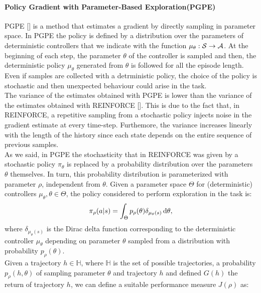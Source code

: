 \paragraph{Policy Gradient with Parameter-Based Exploration(PGPE)} \label{subsec:pgpe}
\ac{PGPE} [\cite{sehnke2008PolicyGradient}] is a method that estimates a gradient by directly sampling in parameter space. In \ac{PGPE} the policy is defined by a distribution over the parameters of deterministic controllers that we indicate with the function $\mu_{\theta}: \mathcal{S} \to \mathcal{A}$. At the beginning of each step, the parameter $\theta$ of the controller is sampled and then, the deterministic policy $\mu_{\theta}$ generated from $\theta$ is followed for all the episode length. Even if samples are collected with a detrministic policy, the choice of the policy is stochastic and then unexpected behaviour could arise in the task.\\
\newline
The variance of the estimates obtained with \ac{PGPE} is lower than the variance of the estimates obtained with REINFORCE [\cite{zhao2013efficient}]. This is due to the fact that, in REINFORCE, a repetitive sampling from a stochastic policy injects noise in the gradient estimate at every time-step. Furthemore, the variance increases linearly with the length of the history since each state depends on the entire sequence of previous samples.\\
\newline
As we said, in \ac{PGPE} the stochasticity that in REINFORCE was given by a stochastic policy $\pi_{\theta}$ is replaced by a probability distribution over the parameters $\theta$ themselves. In turn, this probability distribution is parameterized with parameter $\rho$, independent from $\theta$. Given a parameter space $\Theta$ for (deterministic) controllers $\mu_{\theta}, \theta \in \Theta$, the policy considered to perform exploration in the task is:
\begin{align}
\pi_{\rho}(a|s) = \int_{\Theta} p_{\rho}(\theta) \delta_{\mu_{\theta}(s)}\,\mathrm{d} \theta,
\end{align}
where $\delta_{\mu_{\theta}(s)}$ is the Dirac delta function corresponding to the deterministic controller $\mu_{\theta}$ depending on parameter $\theta$ sampled from a distribution with probability $p_{\rho}(\theta)$.\\
\newline
Given a trajectory $h \in \mathbb{H}$, where $\mathbb{H}$ is the set of possible trajectories, a probability $p_{\rho}(h, \theta)$ of sampling parameter $\theta$ and trajectory $h$ and defined $G(h)$ the return of trajectory $h$, we can define a suitable performance measure $J(\rho)$ as:
